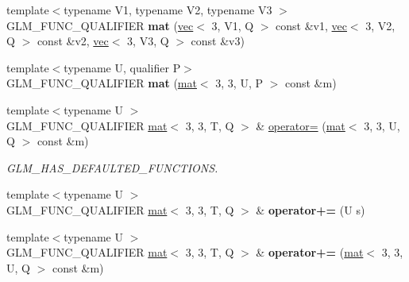\begin{DoxyCompactItemize}
{\footnotesize template$<$typename V1, typename V2, typename V3 $>$ }\\G\+L\+M\+\_\+\+F\+U\+N\+C\+\_\+\+Q\+U\+A\+L\+I\+F\+I\+ER {\bfseries mat} (\hyperlink{structglm_1_1vec}{vec}$<$ 3, V1, Q $>$ const \&v1, \hyperlink{structglm_1_1vec}{vec}$<$ 3, V2, Q $>$ const \&v2, \hyperlink{structglm_1_1vec}{vec}$<$ 3, V3, Q $>$ const \&v3)
\item 
\mbox{\label{structglm_1_1mat_3_013_00_013_00_01T_00_01Q_01_4_a3d1fa34dd6f4feba0d7bbe668db47ed5}} 
{\footnotesize template$<$typename U, qualifier P$>$ }\\G\+L\+M\+\_\+\+F\+U\+N\+C\+\_\+\+Q\+U\+A\+L\+I\+F\+I\+ER {\bfseries mat} (\hyperlink{structglm_1_1mat}{mat}$<$ 3, 3, U, P $>$ const \&m)
\item 
\mbox{\label{structglm_1_1mat_3_013_00_013_00_01T_00_01Q_01_4_ad78ae259ea048141c5a494b60317fe91}} 
{\footnotesize template$<$typename U $>$ }\\G\+L\+M\+\_\+\+F\+U\+N\+C\+\_\+\+Q\+U\+A\+L\+I\+F\+I\+ER \hyperlink{structglm_1_1mat}{mat}$<$ 3, 3, T, Q $>$ \& \hyperlink{structglm_1_1mat_3_013_00_013_00_01T_00_01Q_01_4_ad78ae259ea048141c5a494b60317fe91}{operator=} (\hyperlink{structglm_1_1mat}{mat}$<$ 3, 3, U, Q $>$ const \&m)
\begin{DoxyCompactList}\small\item\em G\+L\+M\+\_\+\+H\+A\+S\+\_\+\+D\+E\+F\+A\+U\+L\+T\+E\+D\+\_\+\+F\+U\+N\+C\+T\+I\+O\+NS. \end{DoxyCompactList}\item 
\mbox{\label{structglm_1_1mat_3_013_00_013_00_01T_00_01Q_01_4_a599b3db0f60dfda57462529ad4406ba8}} 
{\footnotesize template$<$typename U $>$ }\\G\+L\+M\+\_\+\+F\+U\+N\+C\+\_\+\+Q\+U\+A\+L\+I\+F\+I\+ER \hyperlink{structglm_1_1mat}{mat}$<$ 3, 3, T, Q $>$ \& {\bfseries operator+=} (U s)
\item 
\mbox{\label{structglm_1_1mat_3_013_00_013_00_01T_00_01Q_01_4_abc45d059ceb749e219587c8d50e4ecbb}} 
{\footnotesize template$<$typename U $>$ }\\G\+L\+M\+\_\+\+F\+U\+N\+C\+\_\+\+Q\+U\+A\+L\+I\+F\+I\+ER \hyperlink{structglm_1_1mat}{mat}$<$ 3, 3, T, Q $>$ \& {\bfseries operator+=} (\hyperlink{structglm_1_1mat}{mat}$<$ 3, 3, U, Q $>$ const \&m)

\end{DoxyCompactItemize}

